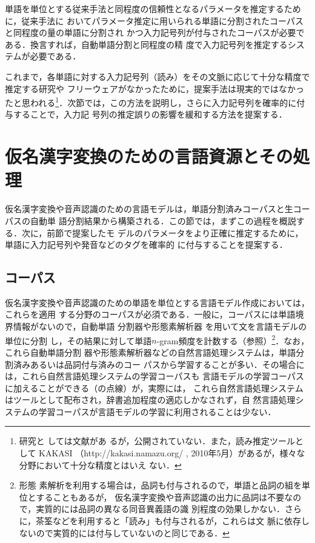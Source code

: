 \documentclass[japanese]{jnlp_JS2.0}
\def\figref#1{}
\def\Cite#1{}
\begin{document}
単語を単位とする従来手法と同程度の信頼性となるパラメータを推定するために，従来手法に
おいてパラメータ推定に用いられる単語に分割されたコーパスと同程度の量の単語に分割され
かつ入力記号列が付与されたコーパスが必要である．換言すれば，自動単語分割と同程度の精
度で入力記号列を推定するシステムが必要である．

これまで，各単語に対する入力記号列（読み）をその文脈に応じて十分な精度で推定する研究や
フリーウェアがなかったために，提案手法は現実的ではなかったと思われる\footnote{研究と
しては文献\Cite{N-gramモデルを用いた音声合成のための読み及びアクセントの同時推定}があ
るが，公開されていない．また，読み推定ツールとして KAKASI （http://kakasi.namazu.org/ , 2010年5月）があるが，様々な分野において十分な精度とはいえ
ない．}．次節では，この方法を説明し，さらに入力記号列を確率的に付与することで，入力記
号列の推定誤りの影響を緩和する方法を提案する．

\section{仮名漢字変換のための言語資源とその処理}
\label{section:LRS}

仮名漢字変換や音声認識のための言語モデルは，単語分割済みコーパスと生コーパスの自動単
語分割結果から構築される．この節では，まずこの過程を概説する．次に，前節で提案したモ
デルのパラメータをより正確に推定するために，単語に入力記号列や発音などのタグを確率的
に付与することを提案する．



\subsection{コーパス}

仮名漢字変換や音声認識のための単語を単位とする言語モデル作成においては，これらを適用
する分野のコーパスが必須である．一般に，コーパスには単語境界情報がないので，自動単語
分割器\cite{点推定と能動学習を用いた自動単語分割器の分野適応}や形態素解析器
\cite{日本語形態素解析システムJUMAN使用説明書.version.1.0,
確率的形態素解析,
統計的言語モデルとN-best探索を用いた日本語形態素解析法,
形態素クラスタリングによる形態素解析精度の向上,
Conditional.Random.Fields.を用いた日本語形態素解析}を用いて文を言語モデルの単位に分割
し，その結果に対して単語$n$-gram頻度を計数する（\figref{figure:LMA}参照）\inhibitglue\footnote{形態
素解析を利用する場合は，品詞も付与されるので，単語と品詞の組を単位とすることもあるが，
仮名漢字変換や音声認識の出力に品詞は不要なので，実質的には品詞の異なる同音異義語の識
別程度の効果しかない．さらに，茶筌などを利用すると「読み」も付与されるが，これらは文
脈に依存しないので実質的には付与していないのと同じである．}．なお，これら自動単語分割
器や形態素解析器などの自然言語処理システムは，単語分割済みあるいは品詞付与済みのコー
パスから学習することが多い．その場合には，これら自然言語処理システムの学習コーパスも
言語モデルの学習コーパスに加えることができる（\figref{figure:LMA}の点線）が，実際には，
これら自然言語処理システムはツールとして配布され，辞書追加程度の適応しかなされず，自
然言語処理システムの学習コーパスが言語モデルの学習に利用されることは少ない．
\end{document}
